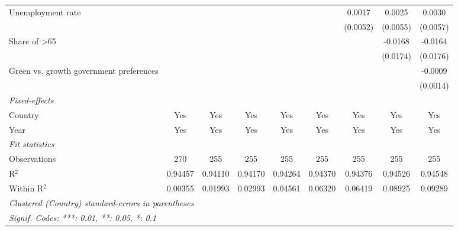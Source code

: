 \begin{table}[htbp]
\begin{tabular}{lcccccccc}
      Unemployment rate                                           &          &          &          &          &          & 0.0017   & 0.0025   & 0.0030\\   
                                                                  &          &          &          &          &          & (0.0052) & (0.0055) & (0.0057)\\   
      Share of >65                                                &          &          &          &          &          &          & -0.0168  & -0.0164\\   
                                                                  &          &          &          &          &          &          & (0.0174) & (0.0176)\\   
      Green vs. growth government preferences                     &          &          &          &          &          &          &          & -0.0009\\   
                                                                  &          &          &          &          &          &          &          & (0.0014)\\   
      \midrule
      \emph{Fixed-effects}\\
      Country                                                     & Yes      & Yes      & Yes      & Yes      & Yes      & Yes      & Yes      & Yes\\  
      Year                                                        & Yes      & Yes      & Yes      & Yes      & Yes      & Yes      & Yes      & Yes\\  
      \midrule
      \emph{Fit statistics}\\
      Observations                                                & 270      & 255      & 255      & 255      & 255      & 255      & 255      & 255\\  
      R$^2$                                                       & 0.94457  & 0.94110  & 0.94170  & 0.94264  & 0.94370  & 0.94376  & 0.94526  & 0.94548\\  
      Within R$^2$                                                & 0.00355  & 0.01993  & 0.02993  & 0.04561  & 0.06320  & 0.06419  & 0.08925  & 0.09289\\  
      \midrule \midrule
      \multicolumn{9}{l}{\emph{Clustered (Country) standard-errors in parentheses}}\\
      \multicolumn{9}{l}{\emph{Signif. Codes: ***: 0.01, **: 0.05, *: 0.1}}\\
   \end{tabular}
\end{table}


